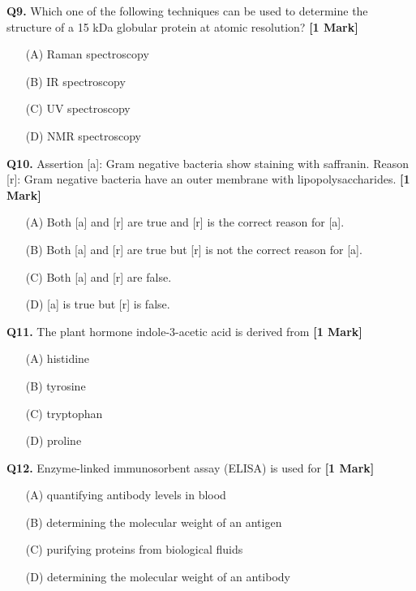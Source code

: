 \documentclass[11pt]{article}
\newcommand{\questiona}[2]{
    \noindent\textbf{Q#2.} #1 \hfill \textbf{[1 Mark]}
}
\begin{document}
\vspace{0.5cm}

\questiona{Which one of the following techniques can be used to determine the structure of a 15 kDa globular protein at atomic resolution?}{9}
\begin{enumerate}
    \item[(A)] Raman spectroscopy
    \item[(B)] IR spectroscopy  
    \item[(C)] UV spectroscopy
    \item[(D)] NMR spectroscopy
\end{enumerate}

\vspace{0.5cm}

\questiona{Assertion [a]: Gram negative bacteria show staining with saffranin. Reason [r]: Gram negative bacteria have an outer membrane with lipopolysaccharides.}{10}
\begin{enumerate}
    \item[(A)] Both [a] and [r] are true and [r] is the correct reason for [a].
    \item[(B)] Both [a] and [r] are true but [r] is not the correct reason for [a].  
    \item[(C)] Both [a] and [r] are false.
    \item[(D)] [a] is true but [r] is false.
\end{enumerate}

\vspace{0.5cm}

\questiona{The plant hormone indole-3-acetic acid is derived from}{11}
\begin{enumerate}
    \item[(A)] histidine
    \item[(B)] tyrosine  
    \item[(C)] tryptophan
    \item[(D)] proline
\end{enumerate}

\vspace{0.5cm}

\questiona{Enzyme-linked immunosorbent assay (ELISA) is used for}{12}
\begin{enumerate}
    \item[(A)] quantifying antibody levels in blood
    \item[(B)] determining the molecular weight of an antigen  
    \item[(C)] purifying proteins from biological fluids
    \item[(D)] determining the molecular weight of an antibody
\end{enumerate}
\end{document}
